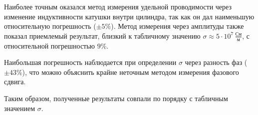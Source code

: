 \documentclass[a4paper]{article}
\begin{document}
Наиболее точным оказался метод измерения удельной проводимости через изменение индуктивности катушки внутри цилиндра, так как он дал наименьшую относительную погрешность ($\pm 5\%$). Метод измерения через амплитуды также показал приемлемый результат, близкий к табличному значению $\sigma \approx 5 \cdot 10^7 \, \frac{\text{См}}{\text{м}}$, с относительной погрешностью $9\%$. 

Наибольшая погрешность наблюдается при определении $\sigma$ через разность фаз ($\pm 43\%$), что можно объяснить крайне неточным методом измерения фазового сдвига.

Таким образом, полученные результаты совпали по порядку с табличным значением $\sigma$.
\end{document}

